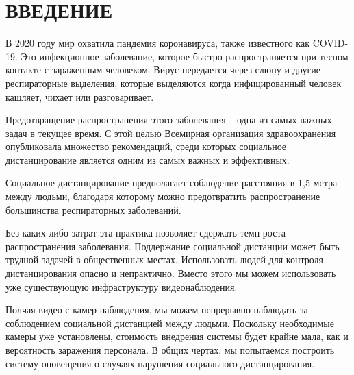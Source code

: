 \chapter*{ВВЕДЕНИЕ}

В 2020 году мир охватила пандемия коронавируса, также известного как COVID-19. Это инфекционное заболевание, которое быстро распространяется при тесном контакте с зараженным человеком. Вирус передается через слюну и другие респираторные выделения, которые выделяются когда инфицированный человек кашляет, чихает или разговаривает.

Предотвращение распространения этого заболевания -- одна из самых важных задач в текущее время. С этой целью Всемирная организация здравоохранения опубликовала множество рекомендаций, среди которых социальное дистанцирование является одним из самых важных и эффективных.

Социальное дистанцирование предполагает соблюдение расстояния в 1,5 метра между людьми, благодаря которому можно предотвратить распространение большинства респираторных заболеваний.

Без каких-либо затрат эта практика позволяет сдержать темп роста распространения заболевания. Поддержание социальной дистанции может быть трудной задачей в общественных местах. Использовать людей для контроля дистанцирования опасно и непрактично. Вместо этого мы можем использовать уже существующую инфраструктуру видеонаблюдения. 

Полчая видео с камер наблюдения, мы можем непрерывно наблюдать за соблюдением социальной дистанцией между людьми. Поскольку необходимые камеры уже установлены, стоимость внедрения системы будет крайне мала, как и вероятность заражения персонала. В общих чертах, мы попытаемся построить систему оповещения о случаях нарушения социального дистанцирования.

\newpage